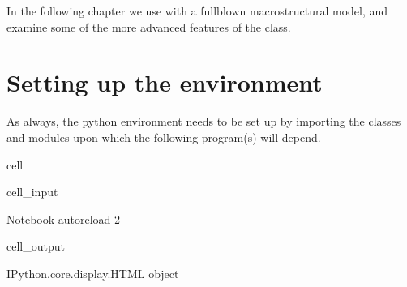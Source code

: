 \documentclass[letterpaper,10pt,english]{jupyterBook}
\begin{document}
\sphinxAtStartPar
In the following chapter we use  with a full\sphinxhyphen{}blown macro\sphinxhyphen{}structural model, and examine some of the more advanced features of the  class.


\section{Setting up the environment}
\label{\detokenize{content/05_SimpleModel/SimpleModel:setting-up-the-environment}}
\sphinxAtStartPar
As always, the python environment needs to be set up by importing the classes and modules upon which the following program(s) will depend.

\begin{sphinxuseclass}{cell}\begin{sphinxVerbatimInput}

\begin{sphinxuseclass}{cell_input}
\begin{sphinxVerbatim}[commandchars=\\\{\}]
 Notebook
    
   
    
 
   
 autoreload
 2
\end{sphinxVerbatim}

\end{sphinxuseclass}\end{sphinxVerbatimInput}
\begin{sphinxVerbatimOutput}

\begin{sphinxuseclass}{cell_output}
\begin{sphinxVerbatim}[commandchars=\\\{\}]
\PYGZlt{}IPython.core.display.HTML object\PYGZgt{}
\end{sphinxVerbatim}

\end{sphinxuseclass}\end{sphinxVerbatimOutput}

\end{sphinxuseclass}
\end{document}
